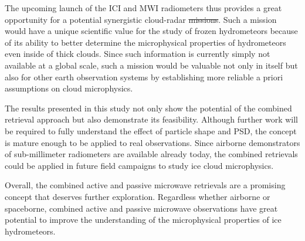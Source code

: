 \documentclass[journal abbreviation, manuscript]{copernicus}
\providecommand{\DIFadd}[1]{{\protect\color{blue}\uwave{#1}}} %
\providecommand{\DIFdel}[1]{{\protect\color{red}\sout{#1}}}                      %
\providecommand{\DIFaddbegin}{} %
\providecommand{\DIFaddend}{} %
\providecommand{\DIFdelbegin}{} %
\providecommand{\DIFdelend}{} %
\begin{document}
The upcoming launch of the ICI and MWI radiometers thus provides a great
opportunity for a potential synergistic cloud-radar \DIFdelbegin \DIFdel{missions}\DIFdelend \DIFaddbegin \DIFadd{mission}\DIFaddend . Such a mission
would have a unique scientific value for the study of frozen hydrometeors
because of its ability to better determine the microphysical properties of
hydrometeors even inside of thick clouds. Since such information is currently
simply not available at a global scale, such a mission would be valuable not
only in itself but also for other earth observation systems by establishing more
reliable a priori assumptions on cloud microphysics.

The results presented in this study not only show the potential of the combined
retrieval approach but also demonstrate its feasibility. Although further work
will be required to fully understand the effect of particle shape and PSD, the
concept is mature enough to be applied to real observations. Since airborne
demonstrators of sub-millimeter radiometers are available already today, the
combined retrievals could be applied in future field campaigns to study ice
cloud microphysics.

Overall, the combined active and passive microwave retrievals are a promising
concept that deserves further exploration. Regardless whether airborne or
spaceborne, combined active and passive microwave observations have great
potential to improve the understanding of the microphysical properties of ice
hydrometeors.





\end{document}
